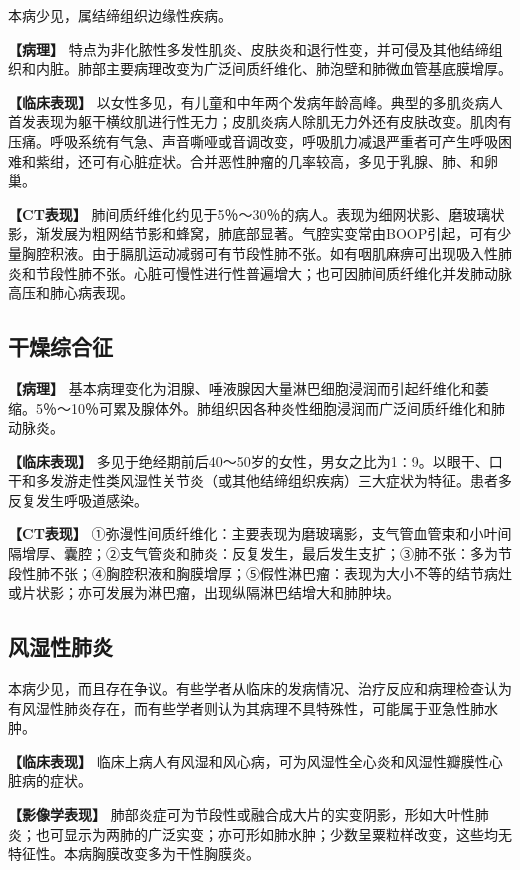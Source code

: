本病少见，属结缔组织边缘性疾病。

\textbf{【病理】}
特点为非化脓性多发性肌炎、皮肤炎和退行性变，并可侵及其他结缔组织和内脏。肺部主要病理改变为广泛间质纤维化、肺泡壁和肺微血管基底膜增厚。

\textbf{【临床表现】}
以女性多见，有儿童和中年两个发病年龄高峰。典型的多肌炎病人首发表现为躯干横纹肌进行性无力；皮肌炎病人除肌无力外还有皮肤改变。肌肉有压痛。呼吸系统有气急、声音嘶哑或音调改变，呼吸肌力减退严重者可产生呼吸困难和紫绀，还可有心脏症状。合并恶性肿瘤的几率较高，多见于乳腺、肺、和卵巢。

\textbf{【CT表现】}
肺间质纤维化约见于5％～30％的病人。表现为细网状影、磨玻璃状影，渐发展为粗网结节影和蜂窝，肺底部显著。气腔实变常由BOOP引起，可有少量胸腔积液。由于膈肌运动减弱可有节段性肺不张。如有咽肌麻痹可出现吸入性肺炎和节段性肺不张。心脏可慢性进行性普遍增大；也可因肺间质纤维化并发肺动脉高压和肺心病表现。

\subsection{干燥综合征}

\textbf{【病理】}
基本病理变化为泪腺、唾液腺因大量淋巴细胞浸润而引起纤维化和萎缩。5％～10％可累及腺体外。肺组织因各种炎性细胞浸润而广泛间质纤维化和肺动脉炎。

\textbf{【临床表现】}
多见于绝经期前后40～50岁的女性，男女之比为1∶9。以眼干、口干和多发游走性类风湿性关节炎（或其他结缔组织疾病）三大症状为特征。患者多反复发生呼吸道感染。

\textbf{【CT表现】}
①弥漫性间质纤维化：主要表现为磨玻璃影，支气管血管束和小叶间隔增厚、囊腔；②支气管炎和肺炎：反复发生，最后发生支扩；③肺不张：多为节段性肺不张；④胸腔积液和胸膜增厚；⑤假性淋巴瘤：表现为大小不等的结节病灶或片状影；亦可发展为淋巴瘤，出现纵隔淋巴结增大和肺肿块。

\subsection{风湿性肺炎}

本病少见，而且存在争议。有些学者从临床的发病情况、治疗反应和病理检查认为有风湿性肺炎存在，而有些学者则认为其病理不具特殊性，可能属于亚急性肺水肿。

\textbf{【临床表现】}
临床上病人有风湿和风心病，可为风湿性全心炎和风湿性瓣膜性心脏病的症状。

\textbf{【影像学表现】}
肺部炎症可为节段性或融合成大片的实变阴影，形如大叶性肺炎；也可显示为两肺的广泛实变；亦可形如肺水肿；少数呈粟粒样改变，这些均无特征性。本病胸膜改变多为干性胸膜炎。

